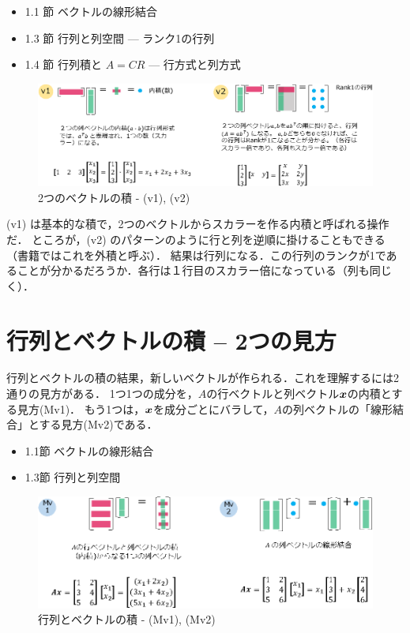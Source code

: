 \documentclass[letterpaper]{article}
\newcommand{\bi}[1]{\hbox{\boldmath$#1$}}
\begin{document}
\begin{itemize}
  \item 1.1 節 ベクトルの線形結合
  \item 1.3 節 行列と列空間 --- ランク1の行列
  \item 1.4 節 行列積と $A=CR$ \; --- 行方式と列方式
\end{itemize} 


\begin{figure}[H]
  \centering
  \includegraphics[keepaspectratio, width=\linewidth]{VectorTimesVector-j.eps}
  \caption{2つのベクトルの積 - (v1), (v2)}
\end{figure}

(v1) は基本的な積で，2つのベクトルからスカラーを作る内積と呼ばれる操作だ．
ところが，(v2) のパターンのように行と列を逆順に掛けることもできる（書籍ではこれを外積と呼ぶ）．
結果は行列になる．この行列のランクが1であることが分かるだろうか．各行は１行目のスカラー倍になっている（列も同じく）．

\section{行列とベクトルの積 -- 2つの見方}

行列とベクトルの積の結果，新しいベクトルが作られる．これを理解するには2通りの見方がある．
1つ1つの成分を，$A$の行ベクトルと列ベクトル$\bi{x}$の内積とする見方(Mv1)．
もう1つは，$\bi{x}$を成分ごとにバラして，$A$の列ベクトルの「線形結合」とする見方(Mv2)である．

\begin{itemize}
  \item 1.1節 ベクトルの線形結合
  \item 1.3節 行列と列空間
\end{itemize} 

\begin{figure}[H]
  \includegraphics[keepaspectratio, width=\linewidth]{MatrixTimesVector-j.eps}
  \caption{行列とベクトルの積 - (Mv1), (Mv2)}
\end{figure}
\end{document}
